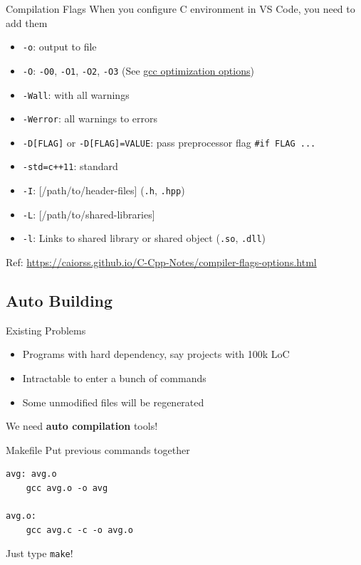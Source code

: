 \documentclass{../TexTemplate/myslide}
\begin{document}
\begin{frame}[fragile]{Compilation Flags}
When you configure C environment in VS Code, you need to add them
\begin{itemize}
	\item \verb'-o': output to file
	\item \verb'-O': \verb'-O0', \verb'-O1', \verb'-O2', \verb'-O3' (See \href{https://gcc.gnu.org/onlinedocs/gcc/Optimize-Options.html}{gcc optimization options})
	\item \verb'-Wall': with all warnings
	\item \verb'-Werror': all warnings to errors
	\item \verb'-D[FLAG]' or \verb'-D[FLAG]=VALUE': pass preprocessor flag \verb'#if FLAG ...'
	\item \verb'-std=c++11': standard
	\item \verb'-I': [/path/to/header-files] (\verb'.h', \verb'.hpp')
	\item \verb'-L': [/path/to/shared-libraries]
	\item \verb'-l': Links to shared library or shared object (\verb'.so', \verb'.dll')
\end{itemize}
\scriptsize Ref: \url{https://caiorss.github.io/C-Cpp-Notes/compiler-flags-options.html}
\end{frame}

\subsection{Auto Building}
\begin{frame}
\subsectionpage
\end{frame}

\begin{frame}{Existing Problems}
\begin{itemize}
\item Programs with hard dependency, say projects with 100k LoC
\item Intractable to enter a bunch of commands
\item Some unmodified files will be regenerated
\end{itemize}
\pause
\begin{center}
\large We need \textbf{auto compilation} tools!
\end{center}
\end{frame}

\begin{frame}[fragile]{Makefile}
Put previous commands together
\begin{verbatim}
avg: avg.o
	gcc avg.o -o avg

avg.o:
	gcc avg.c -c -o avg.o
\end{verbatim}
Just type \verb'make'!
\end{frame}
\end{document}
